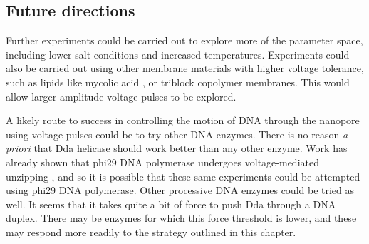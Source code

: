 \subsection{Future directions}

Further experiments could be carried out to explore more of the parameter space, including lower salt conditions and increased temperatures.  Experiments could also be carried out using other membrane materials with higher voltage tolerance, such as lipids like mycolic acid \citep{Langford2011}, or triblock copolymer membranes.  This would allow larger amplitude voltage pulses to be explored.

A likely route to success in controlling the motion of DNA through the nanopore using voltage pulses could be to try other DNA enzymes.  There is no reason \textit{a priori} that Dda helicase should work better than any other enzyme.  Work has already shown that phi29 DNA polymerase undergoes voltage-mediated unzipping \citep{Cherf2012}, and so it is possible that these same experiments could be attempted using phi29 DNA polymerase.  Other processive DNA enzymes could be tried as well.  It seems that it takes quite a bit of force to push Dda through a DNA duplex.  There may be enzymes for which this force threshold is lower, and these may respond more readily to the strategy outlined in this chapter.
